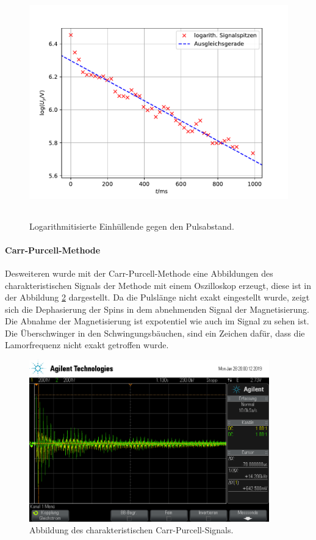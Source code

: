 \begin{figure}
  \centering
  \includegraphics[height = 10cm]{plots/T2plot.pdf}
  \caption{Logarithmitisierte Einhüllende gegen den Pulsabstand.}
  \label{fig:T2}
\end{figure}
\FloatBarrier
\paragraph{Carr-Purcell-Methode}
Desweiteren wurde mit der Carr-Purcell-Methode eine Abbildungen des charakteristischen Signals der Methode mit einem 
Oszilloskop erzeugt, diese ist in der Abbildung \ref{fig:PCM} dargestellt. Da die Pulslänge nicht exakt 
eingestellt wurde, zeigt sich die Dephasierung der Spins in dem abnehmenden Signal 
der Magnetisierung. Die Abnahme der Magnetisierung ist expotentiel wie auch im Signal zu sehen ist. 
Die Überschwinger in den Schwingungsbäuchen, sind ein Zeichen dafür, dass die Lamorfrequenz 
nicht exakt getroffen wurde.
\begin{figure}
  \centering
  \includegraphics[height = 7cm]{plots/scope_3.png}
  \caption{Abbildung des charakteristischen Carr-Purcell-Signals.}
  \label{fig:PCM}
\end{figure}
\FloatBarrier

